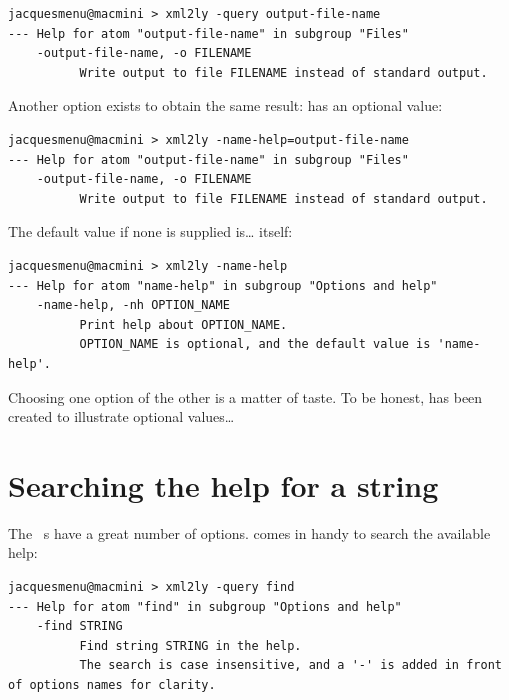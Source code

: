 \begin{lstlisting}[language=Terminal]
jacquesmenu@macmini > xml2ly -query output-file-name
--- Help for atom "output-file-name" in subgroup "Files"
    -output-file-name, -o FILENAME
          Write output to file FILENAME instead of standard output.
\end{lstlisting}

Another option exists to obtain the same result:  has an optional value:
\begin{lstlisting}[language=Terminal]
jacquesmenu@macmini > xml2ly -name-help=output-file-name
--- Help for atom "output-file-name" in subgroup "Files"
    -output-file-name, -o FILENAME
          Write output to file FILENAME instead of standard output.
\end{lstlisting}

The default value if none is supplied is\dots {} itself:
\begin{lstlisting}[language=Terminal]
jacquesmenu@macmini > xml2ly -name-help
--- Help for atom "name-help" in subgroup "Options and help"
    -name-help, -nh OPTION_NAME
          Print help about OPTION_NAME.
          OPTION_NAME is optional, and the default value is 'name-help'.
\end{lstlisting}

Choosing one option of the other is a matter of taste. To be honest,  has been created to illustrate optional values\dots


\section{Searching the help for a string}

The \mf\ \service s have a great number of options.  comes in handy to search the available help:
\begin{lstlisting}[language=Terminal]
jacquesmenu@macmini > xml2ly -query find
--- Help for atom "find" in subgroup "Options and help"
    -find STRING
          Find string STRING in the help.
          The search is case insensitive, and a '-' is added in front of options names for clarity.
\end{lstlisting}

